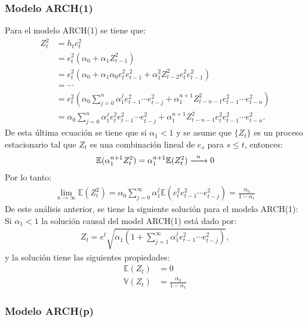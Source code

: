 \subsubsection{Modelo ARCH(1)}

 Para el modelo ARCH(1) se tiene que:
\begin{align*}
    Z_t^2 &= h_t e_{t}^2\\
    &= e_t^2\left(\alpha_0 + \alpha_1 Z_{t-1}^2\right)\\
    &= e_t^2\left(\alpha_0 +  \alpha_1\alpha_0 e^{2}_{t} e^{2}_{t-1}+ \alpha_1^2 Z_{t-2}^2e^{ 2}_te^{2}_{t-1}\right)\\
    &= \cdots\\
    &= e_t^2\left(\alpha_0 \sum_{j=0}^n \alpha_1^{j}e_{t-1}^2\cdots e_{t-j}^2 +  \alpha_1^{n+1}Z_{t-n-1}^2  e^{2}_{t-1}\cdots e^{2}_{t-n}\right)\\
    &= \alpha_0 \sum_{j=0}^n \alpha_1^{j}e^{2}_t e_{t-1}^2\cdots e_{t-j}^2 +  \alpha_1^{n+1}Z_{t-n-1}^2  e^2_t e^{2}_{t-1}\cdots e^{2}_{t-n}.
\end{align*}
De esta última ecuación se tiene que si $\alpha_1<1$ y se asume que $\{Z_t\}$ es un proceso estacionario tal que $Z_t$ es una combinación lineal de $e_s$ para $s\leq t$, entonces:
\begin{align*}
    \mathbb{E}(\alpha_1^{n+1}Z_{t}^2)=\alpha_1^{n+1}\mathbb{E}(Z_{t}^2)\xrightarrow{\enskip n \enskip} 0 
\end{align*}  
Por lo tanto:
\begin{align*}
    \lim_{n\rightarrow \infty}\mathbb{E}(Z_t^2)= \alpha_0 \sum_{j=0}^\infty \alpha_1^{j}\mathbb{E}( e^{2}_t e_{t-1}^2\cdots e_{t-j}^2 )=\frac{\alpha_0}{1-\alpha_1}
\end{align*}
De este análisis anterior, se tiene la siguiente solución para el modelo ARCH(1):
Si $\alpha_1<1$ la solución causal del model ARCH(1) está dado por: 
\begin{align}
    Z_t=e^t\sqrt{\alpha_1\left(1+\sum_{j=1}^{\infty}\alpha_1^j e_{t-1}^2 \cdots e^{2}_{t-j} \right)},
\end{align}
y la solución tiene las siguientes propiedades:
\begin{align*}
    \mathbb{E}(Z_t)&=0\\
    \mathbb{V}(Z_t)&=\frac{\alpha_0}{1-\alpha_1}
\end{align*}
\subsubsection{ Modelo ARCH(p)}

